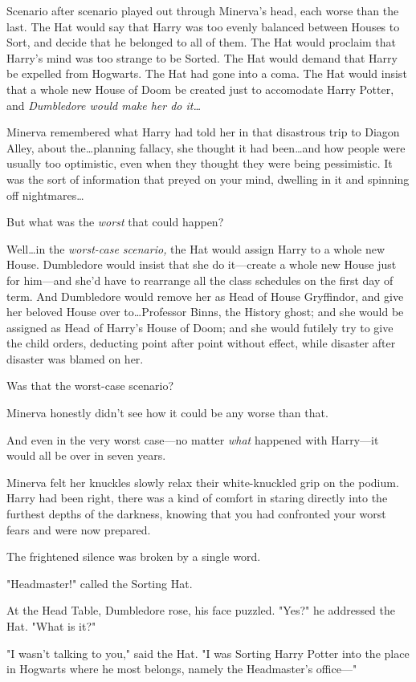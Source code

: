 Scenario after scenario played out through Minerva's head, each worse than the
last. The Hat would say that Harry was too evenly balanced between Houses to
Sort, and decide that he belonged to all of them. The Hat would proclaim that
Harry's mind was too strange to be Sorted. The Hat would demand that Harry be
expelled from Hogwarts. The Hat had gone into a coma. The Hat would insist that
a whole new House of Doom be created just to accomodate Harry Potter, and
\emph{Dumbledore would make her do it…}

Minerva remembered what Harry had told her in that disastrous trip to Diagon
Alley, about the…planning fallacy, she thought it had been…and
how people were usually too optimistic, even when they thought they were being
pessimistic. It was the sort of information that preyed on your mind, dwelling
in it and spinning off nightmares…

But what was the \emph{worst} that could happen?

Well…in the \emph{worst-case scenario,} the Hat would assign Harry to a
whole new House. Dumbledore would insist that she do it---create a whole new
House just for him---and she'd have to rearrange all the class schedules on the
first day of term. And Dumbledore would remove her as Head of House Gryffindor,
and give her beloved House over to…Professor Binns, the History ghost;
and she would be assigned as Head of Harry's House of Doom; and she would
futilely try to give the child orders, deducting point after point without
effect, while disaster after disaster was blamed on her.

Was that the worst-case scenario?

Minerva honestly didn't see how it could be any worse than that.

And even in the very worst case---no matter \emph{what} happened with
Harry---it would all be over in seven years.

Minerva felt her knuckles slowly relax their white-knuckled grip on the podium.
Harry had been right, there was a kind of comfort in staring directly into the
furthest depths of the darkness, knowing that you had confronted your worst
fears and were now prepared.

The frightened silence was broken by a single word.

"Headmaster!" called the Sorting Hat.

At the Head Table, Dumbledore rose, his face puzzled. "Yes?" he addressed the
Hat. "What is it?"

"I wasn't talking to you," said the Hat. "I was Sorting Harry Potter into the
place in Hogwarts where he most belongs, namely the Headmaster's office---"
